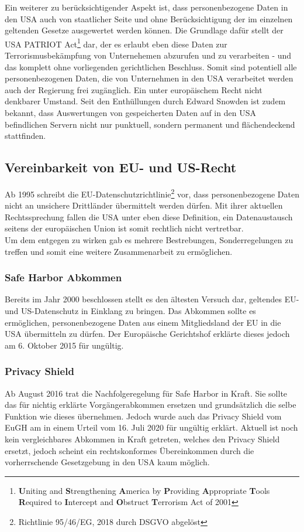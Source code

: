    Ein weiterer zu berücksichtigender Aspekt ist, dass personenbezogene Daten in den USA auch von staatlicher Seite und ohne Berücksichtigung der im einzelnen geltenden Gesetze ausgewertet werden können. Die Grundlage dafür stellt der \glqq USA PATRIOT Act\grqq{}\footnote{\textbf{U}niting and \textbf{S}trengthening \textbf{A}merica by \textbf{P}roviding \textbf{A}ppropriate \textbf{T}ools \textbf{R}equired to \textbf{I}ntercept and \textbf{O}bstruct \textbf{T}errorism Act of 2001} dar, der es erlaubt eben diese Daten zur Terrorismusbekämpfung von Unternehemen abzurufen und zu verarbeiten - und das komplett ohne vorliegenden gerichtlichen Beschluss. Somit sind potentiell alle personenbezogenen Daten, die von Unternehmen in den USA verarbeitet werden auch der Regierung frei zugänglich. Ein unter europäischem Recht nicht denkbarer Umstand. Seit den Enthüllungen durch Edward Snowden ist zudem bekannt, dass Auswertungen von gespeicherten Daten auf in den USA befindlichen Servern nicht nur punktuell, sondern permanent und flächendeckend stattfinden.\\
\subsection{Vereinbarkeit von EU- und US-Recht}
    Ab 1995 schreibt die EU-Datenschutzrichtlinie\footnote{Richtlinie 95/46/EG, 2018 durch DSGVO abgelöst} vor, dass personenbezogene Daten nicht an unsichere Drittländer übermittelt werden dürfen. Mit ihrer aktuellen Rechtssprechung fallen die USA unter eben diese Definition, ein Datenaustausch seitens der europäischen Union ist somit rechtlich nicht vertretbar.\\
    Um dem entgegen zu wirken gab es mehrere Bestrebungen, Sonderregelungen zu treffen und somit eine weitere Zusammenarbeit zu ermöglichen.

\subsubsection{Safe Harbor Abkommen}
    Bereits im Jahr 2000 beschlossen stellt es den ältesten Versuch dar, geltendes EU- und US-Datenschutz in Einklang zu bringen. Das Abkommen sollte es ermöglichen, personenbezogene Daten aus einem Mitgliedsland der EU in die USA übermitteln zu dürfen. Der Europäische Gerichtshof erklärte dieses jedoch am 6. Oktober 2015 für ungültig.

\subsubsection{Privacy Shield}
    Ab August 2016 trat die Nachfolgeregelung für Safe Harbor in Kraft. Sie sollte das für nichtig erklärte Vorgängerabkommen ersetzen und grundsätzlich die selbe Funktion wie dieses übernehmen. Jedoch wurde auch das Privacy Shield vom EuGH am in einem Urteil vom 16. Juli 2020 für ungültig erklärt. Aktuell ist noch kein vergleichbares Abkommen in Kraft getreten, welches den Privacy Shield ersetzt, jedoch scheint ein rechtskonformes Übereinkommen durch die vorherrschende Gesetzgebung in den USA kaum möglich.
\vfill